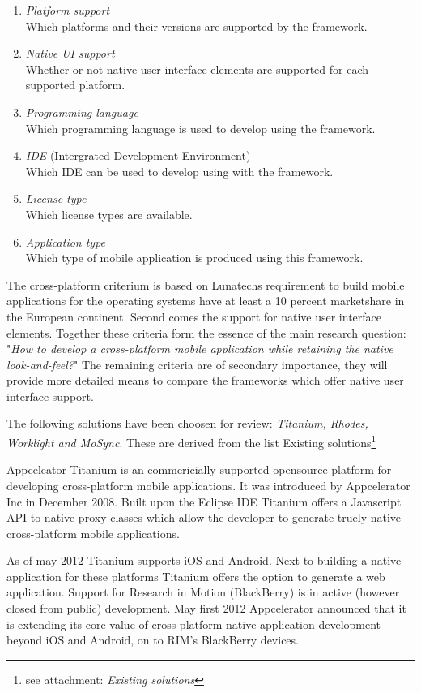 \begin{enumerate}
\item \emph{Platform support}\\
Which platforms and their versions are supported by the framework.
\item \emph{Native UI support}\\
Whether or not native user interface elements are supported for each supported platform.
\item \emph{Programming language}\\
Which programming language is used to develop using the framework.
\item \emph{IDE} (Intergrated Development Environment)\\
Which IDE can be used to develop using with the framework.
\item \emph{License type}\\
Which license types are available.
\item \emph{Application type}\\
Which type of mobile application is produced using this framework.
\end{enumerate}

The cross-platform criterium is based on Lunatechs requirement to build mobile applications for the operating systems have at least a 10 percent marketshare in the European continent. Second  comes the support for native user interface elements. Together these criteria form the essence of the main research question: "\emph{How to develop a cross-platform mobile application while retaining the native look-and-feel?}"
The remaining criteria are of secondary importance, they will provide more detailed means to compare the frameworks which offer native user interface support.

The following solutions have been choosen for review: \emph{Titanium, Rhodes, Worklight and MoSync}. These are derived from the list Existing solutions\footnote{see attachment: \emph{Existing solutions}} %


Appceleator Titanium is an commericially supported opensource platform for developing cross-platform mobile applications. It was introduced by Appcelerator Inc in December 2008. Built upon the Eclipse IDE Titanium offers a Javascript API to native proxy classes which allow the developer to generate truely native cross-platform mobile applications. 

As of may 2012 Titanium supports iOS and Android. Next to building a native application for these platforms Titanium offers the option to generate a web application. 
Support for Research in Motion (BlackBerry) is in active (however closed from public) development. May first 2012 Appcelerator announced that it is extending its core value of cross-platform native application development beyond iOS and Android, on to RIM's BlackBerry devices.\cite{Asher2012}

